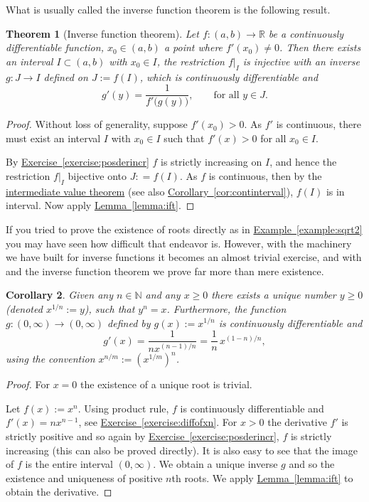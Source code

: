 \documentclass[12pt]{book}
\newcommand{\R}{{\mathbb{R}}}
\newcommand{\N}{{\mathbb{N}}}
\theoremstyle{plain}
\newtheorem{thm}{Theorem}[section]
\newtheorem{cor}[thm]{Corollary}
\theoremstyle{remark}
\theoremstyle{definition}
\theoremstyle{exercise}
\theoremstyle{example}
\newcommand{\exerciseref}[1]{\hyperref[#1]{Exercise~\ref*{#1}}}
\newcommand{\exampleref}[1]{\hyperref[#1]{Example~\ref*{#1}}}
\newcommand{\lemmaref}[1]{\hyperref[#1]{Lemma~\ref*{#1}}}
\newcommand{\corref}[1]{\hyperref[#1]{Corollary~\ref*{#1}}}
\begin{document}
What is usually called the inverse function theorem is the following result.

\begin{thm}[Inverse function theorem]
Let $f \colon (a,b) \to \R$ be a continuously differentiable function,
$x_0 \in (a,b)$ a point where $f'(x_0) \not= 0$.  Then there exists
an interval $I \subset (a,b)$ with $x_0 \in I$, the
restriction $f|_{I}$ is injective with an inverse
$g \colon J \to I$ defined on $J := f(I)$,
which is continuously differentiable and
\begin{equation*}
g'(y) = \frac{1}{f'\bigl( g(y) \bigr)} , \qquad \text{for all $y \in J$}.
\end{equation*}
\end{thm}

\begin{proof}
Without loss of generality, suppose $f'(x_0) > 0$.  As $f'$ is
continuous, there must exist an interval $I$ with $x_0 \in I$
such that $f'(x) > 0$ for all $x_0 \in I$.

By \exerciseref{exercise:posderincr} $f$ is strictly increasing
on $I$, and hence the restriction $f|_{I}$ bijective onto $J: = f(I)$.
As $f$ is continuous, then by the
\hyperref[IVT:thm]{intermediate value theorem}
(see also \corref{cor:continterval}), $f(I)$ is in interval.
Now apply \lemmaref{lemma:ift}.
\end{proof}

If you tried to prove the existence of roots directly as in
\exampleref{example:sqrt2} you may have seen
how difficult that endeavor is.  However, with the machinery we have built
for inverse functions it becomes
an almost trivial exercise, and with and the inverse function theorem
we prove far more than mere existence.

\begin{cor}
Given any $n \in \N$ and any $x \geq 0$ there exists a unique 
number $y \geq 0$ (denoted $x^{1/n} := y$), such that $y^n = x$.  Furthermore,
the function $g \colon (0,\infty) \to (0,\infty)$ defined by
$g(x) := x^{1/n}$ is continuously differentiable and
\begin{equation*}
g'(x) = \frac{1}{nx^{(n-1)/n}} = \frac{1}{n} \, x^{(1-n)/n} ,
\end{equation*}
using the convention $x^{n/m} := {(x^{1/m})}^{n}$.
\end{cor}

\begin{proof}
For $x=0$ the existence of a unique root is trivial.

Let $f(x) := x^n$.  Using product rule, $f$ is continuously differentiable
and $f'(x) = nx^{n-1}$, see \exerciseref{exercise:diffofxn}.  For $x > 0$ the derivative $f'$ is strictly positive
and so again by \exerciseref{exercise:posderincr}, $f$ is strictly
increasing (this can also be proved directly).  It is also easy to
see that the image of $f$ is the entire interval $(0,\infty)$.  We 
obtain a unique inverse $g$ and so the existence and uniqueness of positive
$n$th roots.  We apply \lemmaref{lemma:ift} to obtain the derivative.
\end{proof}
\end{document}
